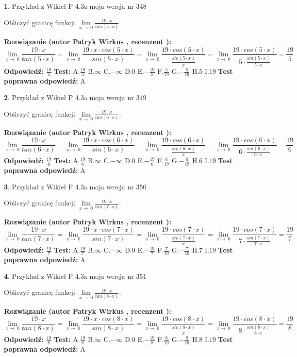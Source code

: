 \documentclass[12pt, a4paper]{article}
\theoremstyle{definition} %
\newtheorem{zad}{}
\newcommand{\zadStart}[1]{\begin{zad}#1\newline}
\newcommand{\zadStop}{\end{zad}}
\newcommand{\rozwStart}[2]{\noindent \textbf{Rozwiązanie (autor #1 , recenzent #2): }\newline}
\newcommand{\rozwStop}{\newline}
\newcommand{\odpStart}{\noindent \textbf{Odpowiedź:}\newline}
\newcommand{\odpStop}{\newline}
\newcommand{\testStart}{\noindent \textbf{Test:}\newline}
\newcommand{\testStop}{\newline}
\newcommand{\kluczStart}{\noindent \textbf{Test poprawna odpowiedź:}\newline}
\newcommand{\kluczStop}{\newline}
\begin{document}
\zadStart{Przykład z Wikieł P 4.3a moja wersja nr 348}


Obliczyć granicę funkcji $\lim\limits_{x\to\ 0}\frac{19 \cdot x}{tan(5 \cdot x)}$.
\zadStop
\rozwStart{Patryk Wirkus}{}
$$\lim\limits_{x\to\ 0}\frac{19 \cdot x}{tan(5 \cdot x)}=\lim\limits_{x\to\ 0}\frac{19 \cdot x \cdot cos(5 \cdot x)}{sin(5 \cdot x)}=\lim\limits_{x\to\ 0}\frac{19 \cdot cos(5 \cdot x)}{\frac{sin(5 \cdot x)}{x}}=\lim\limits_{x\to\ 0}\frac{19 \cdot cos(5 \cdot x)}{5 \cdot \frac{sin(5 \cdot x)}{5 \cdot x}} = \frac{19}{5}$$
\rozwStop
\odpStart
$\frac{19}{5}$
\odpStop
\testStart
A.$\frac{19}{5}$
B.$\infty$
C.$-\infty$
D.$0$
E.$-\frac{19}{5}$
F.$\frac{5}{19}$
G.$-\frac{5}{19}$
H.$5$
I.$19$
\testStop
\kluczStart
A
\kluczStop



\zadStart{Przykład z Wikieł P 4.3a moja wersja nr 349}


Obliczyć granicę funkcji $\lim\limits_{x\to\ 0}\frac{19 \cdot x}{tan(6 \cdot x)}$.
\zadStop
\rozwStart{Patryk Wirkus}{}
$$\lim\limits_{x\to\ 0}\frac{19 \cdot x}{tan(6 \cdot x)}=\lim\limits_{x\to\ 0}\frac{19 \cdot x \cdot cos(6 \cdot x)}{sin(6 \cdot x)}=\lim\limits_{x\to\ 0}\frac{19 \cdot cos(6 \cdot x)}{\frac{sin(6 \cdot x)}{x}}=\lim\limits_{x\to\ 0}\frac{19 \cdot cos(6 \cdot x)}{6 \cdot \frac{sin(6 \cdot x)}{6 \cdot x}} = \frac{19}{6}$$
\rozwStop
\odpStart
$\frac{19}{6}$
\odpStop
\testStart
A.$\frac{19}{6}$
B.$\infty$
C.$-\infty$
D.$0$
E.$-\frac{19}{6}$
F.$\frac{6}{19}$
G.$-\frac{6}{19}$
H.$6$
I.$19$
\testStop
\kluczStart
A
\kluczStop



\zadStart{Przykład z Wikieł P 4.3a moja wersja nr 350}


Obliczyć granicę funkcji $\lim\limits_{x\to\ 0}\frac{19 \cdot x}{tan(7 \cdot x)}$.
\zadStop
\rozwStart{Patryk Wirkus}{}
$$\lim\limits_{x\to\ 0}\frac{19 \cdot x}{tan(7 \cdot x)}=\lim\limits_{x\to\ 0}\frac{19 \cdot x \cdot cos(7 \cdot x)}{sin(7 \cdot x)}=\lim\limits_{x\to\ 0}\frac{19 \cdot cos(7 \cdot x)}{\frac{sin(7 \cdot x)}{x}}=\lim\limits_{x\to\ 0}\frac{19 \cdot cos(7 \cdot x)}{7 \cdot \frac{sin(7 \cdot x)}{7 \cdot x}} = \frac{19}{7}$$
\rozwStop
\odpStart
$\frac{19}{7}$
\odpStop
\testStart
A.$\frac{19}{7}$
B.$\infty$
C.$-\infty$
D.$0$
E.$-\frac{19}{7}$
F.$\frac{7}{19}$
G.$-\frac{7}{19}$
H.$7$
I.$19$
\testStop
\kluczStart
A
\kluczStop



\zadStart{Przykład z Wikieł P 4.3a moja wersja nr 351}


Obliczyć granicę funkcji $\lim\limits_{x\to\ 0}\frac{19 \cdot x}{tan(8 \cdot x)}$.
\zadStop
\rozwStart{Patryk Wirkus}{}
$$\lim\limits_{x\to\ 0}\frac{19 \cdot x}{tan(8 \cdot x)}=\lim\limits_{x\to\ 0}\frac{19 \cdot x \cdot cos(8 \cdot x)}{sin(8 \cdot x)}=\lim\limits_{x\to\ 0}\frac{19 \cdot cos(8 \cdot x)}{\frac{sin(8 \cdot x)}{x}}=\lim\limits_{x\to\ 0}\frac{19 \cdot cos(8 \cdot x)}{8 \cdot \frac{sin(8 \cdot x)}{8 \cdot x}} = \frac{19}{8}$$
\rozwStop
\odpStart
$\frac{19}{8}$
\odpStop
\testStart
A.$\frac{19}{8}$
B.$\infty$
C.$-\infty$
D.$0$
E.$-\frac{19}{8}$
F.$\frac{8}{19}$
G.$-\frac{8}{19}$
H.$8$
I.$19$
\testStop
\kluczStart
A
\kluczStop
\end{document}
